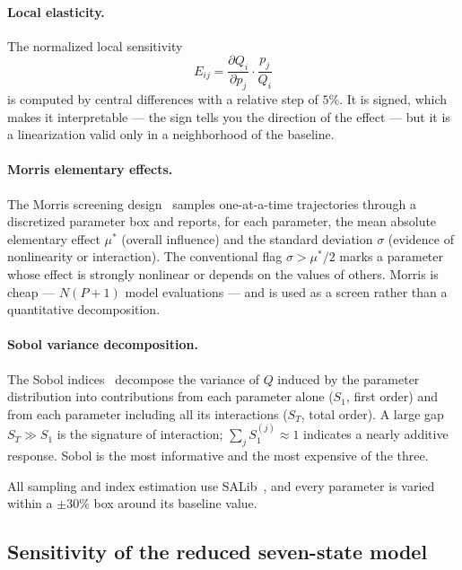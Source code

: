 \documentclass[11pt]{article}
\begin{document}
\paragraph{Local elasticity.} The normalized local sensitivity
\begin{equation}
E_{ij} = \frac{\partial Q_i}{\partial p_j}\cdot\frac{p_j}{Q_i}
\end{equation}
is computed by central differences with a relative step of $5\%$. It is signed,
which makes it interpretable --- the sign tells you the direction of the effect
--- but it is a linearization valid only in a neighborhood of the baseline.

\paragraph{Morris elementary effects.} The Morris
screening design~\citep{morris1991factorial,campolongo2007screening} samples
one-at-a-time trajectories through a discretized parameter box and reports, for
each parameter, the mean absolute elementary effect $\mu^*$ (overall influence)
and the standard deviation $\sigma$ (evidence of nonlinearity or interaction).
The conventional flag $\sigma > \mu^*/2$ marks a parameter whose effect is
strongly nonlinear or depends on the values of others. Morris is cheap ---
$N(P+1)$ model evaluations --- and is used as a screen rather than a
quantitative decomposition.

\paragraph{Sobol variance decomposition.} The Sobol
indices~\citep{sobol2001global,saltelli2010variance} decompose the variance of
$Q$ induced by the parameter distribution into contributions from each
parameter alone ($S_1$, first order) and from each parameter including all its
interactions ($S_T$, total order). A large gap $S_T \gg S_1$ is the signature of
interaction; $\sum_j S_1^{(j)} \approx 1$ indicates a nearly additive response.
Sobol is the most informative and the most expensive of the three.

All sampling and index estimation use SALib~\citep{herman2017salib}, and every
parameter is varied within a $\pm 30\%$ box around its baseline value.

\subsection{Sensitivity of the reduced seven-state model}
\end{document}
